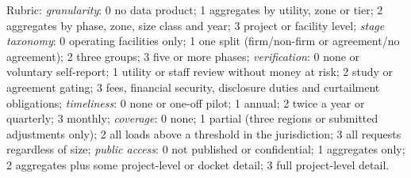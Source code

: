 \begin{minipage}{\textwidth}\scriptsize Rubric: \textit{granularity}: 0 no data product; 1 aggregates by utility, zone or tier; 2 aggregates by phase, zone, size class and year; 3 project or facility level; \textit{stage taxonomy}: 0 operating facilities only; 1 one split (firm/non-firm or agreement/no agreement); 2 three groups; 3 five or more phases; \textit{verification}: 0 none or voluntary self-report; 1 utility or staff review without money at risk; 2 study or agreement gating; 3 fees, financial security, disclosure duties and curtailment obligations; \textit{timeliness}: 0 none or one-off pilot; 1 annual; 2 twice a year or quarterly; 3 monthly; \textit{coverage}: 0 none; 1 partial (three regions or submitted adjustments only); 2 all loads above a threshold in the jurisdiction; 3 all requests regardless of size; \textit{public access}: 0 not published or confidential; 1 aggregates only; 2 aggregates plus some project-level or docket detail; 3 full project-level detail.\end{minipage}
